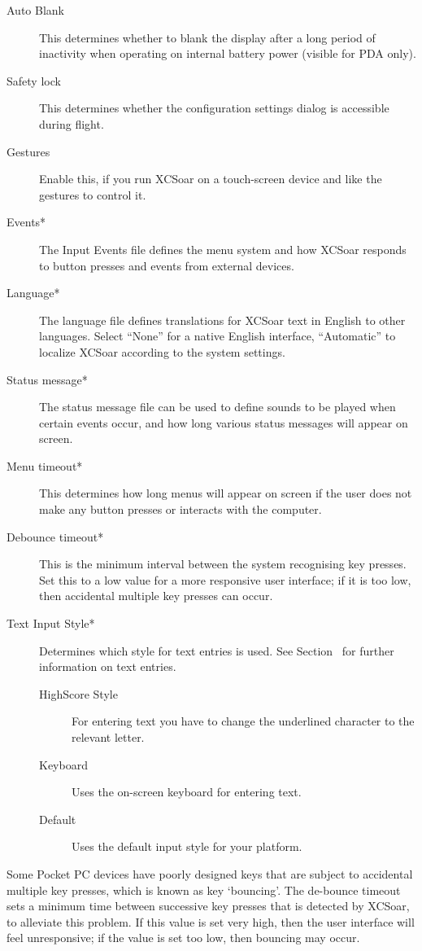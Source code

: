 \documentclass[a4paper,12pt]{refrep}
\begin{document}
\begin{description}
\item[Auto Blank] This determines whether to blank the display after a long
period of inactivity when operating on internal battery power (visible for PDA
only).

\item[Safety lock]  This determines whether the configuration settings dialog is
accessible during flight.
\item[Gestures]  Enable this, if you run XCSoar on a touch-screen device and
like the gestures to control it.
\item[Events*]  The Input Events file defines the menu system and how XCSoar
responds to button presses and events from external devices.
\item[Language*]  The language file defines translations for XCSoar text in English to
other languages.  Select ``None'' for a native English interface, ``Automatic''
to localize XCSoar according to the system settings.
\item[Status message*]  The status message file can be used to define sounds to be played when certain
events occur, and how long various status messages will appear on screen.
\item[Menu timeout*]  This determines how long menus will appear on screen if the user
does not make any button presses or interacts with the computer.
\item[Debounce timeout*]  This is the minimum interval between the system recognising key presses. 
Set this to a low value for a more responsive user interface; if
it is too low, then accidental multiple key presses can occur.

\item[Text Input Style*] Determines which style for text entries is used. See Section~ for further information on text entries.
\begin{description}
\item[HighScore Style] For entering text you have to change the underlined character to the relevant letter.
\item[Keyboard] Uses the on-screen keyboard for entering text.
\item[Default] Uses the default input style for your platform.
\end{description}
\end{description}

Some Pocket PC devices have poorly designed keys that are subject to
accidental multiple key presses, which is known as key `bouncing'.  The
de-bounce timeout sets a minimum time between successive key presses
that is detected by XCSoar, to alleviate this problem.  If this value
is set very high, then the user interface will feel unresponsive; if
the value is set too low, then bouncing may occur.
\end{document}
